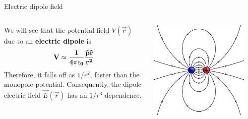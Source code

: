 \begin{frame}{Electric dipole field}
\vspace{0.3cm}

\begin{columns}
  \begin{column}{0.80\textwidth}
     We will see that the potential field $V(\vec{r})$ due to an {\bf electric dipole} is
     \begin{equation*}
        {\bf V \approx \frac{1}{4\pi\epsilon_0} \frac{\vec{p} \hat{r}}{r^2} }
     \end{equation*}
     Therefore, it falls off as $1/r^2$, faster than the monopole potential.
     Consequently, the dipole electric field $\vec{E}(\vec{r})$
     has an $1/r^3$ dependence.
  \end{column}
  \begin{column}{0.20\textwidth}
   \begin{center}
     \includegraphics[width=0.90\textwidth]{./images/schematics/electric_dipole_field_lines_2.png}\\
   \end{center}
  \end{column}
\end{columns}

\end{frame}


%
%
%

